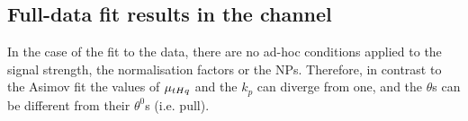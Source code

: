 \begin{comment}
\begin{figure}[h]
\centering
 \texttt{[image: Chapter5\_tHq/NPs/SS\_new/SS\_BONLYCRONLY/CorrMatrix]}
\caption{Correlation between the different NPs and $k_{\ttbar, \ttX}$ the in the \dilepSStau in the \text{CR-only--background-only} fit. 
Only the NPs with at least one correlation above 15\% are shown. There are not correlations with $\mu_{\tHq}$ under
the background-only hypothesis.} 
\label{fig:ChaptH:BONLYCRONLY:SS:Correlation}
\end{figure}


Regarding the single normalisation factor used to control the \ttbar, \ttW, \ttH ,and \ttZ backgrounds simultaneously, it is:
\begin{align}
	 k_{\ttbar, \ttX} 	&= 0.60 \pm 0.15 (\text{tot.}) \pm 0.13 (\text{stat.}) 	\label{eq:ChaptH:Fit:BONLYCRONLY:SS:k} \,
\end{align}
Observe that the value differs significantly from the SM predictions. The large statistical uncertainty hints
that the statistical sample is too little to result inn a correct estimation. Also, the observed mismodelling 
in the \dilepSStau samples is the main reason of the small normalisation. As can be seen in Figure~\ref{fig:ChaptH:PreFit:SS:CR},
there is a general excess of MC over the collected data and, hence, the small $k_{\ttbar, \ttX}$ corrects this effect.


\FloatBarrier 

\end{comment} 

\subsection{Full-data fit results in the \dilepOStau channel}
\label{sec:ChaptH:Fit:fitToData:OS}
In the case of the fit to the data, there are no ad-hoc conditions applied to the signal strength, 
the normalisation factors or the NPs. Therefore, in contrast to the Asimov fit
the values of $\mu_{tHq}$ and the $k_p$ can diverge 
from one, and the $\theta$s can be different from their $\theta^{0}$s (i.e. pull).



